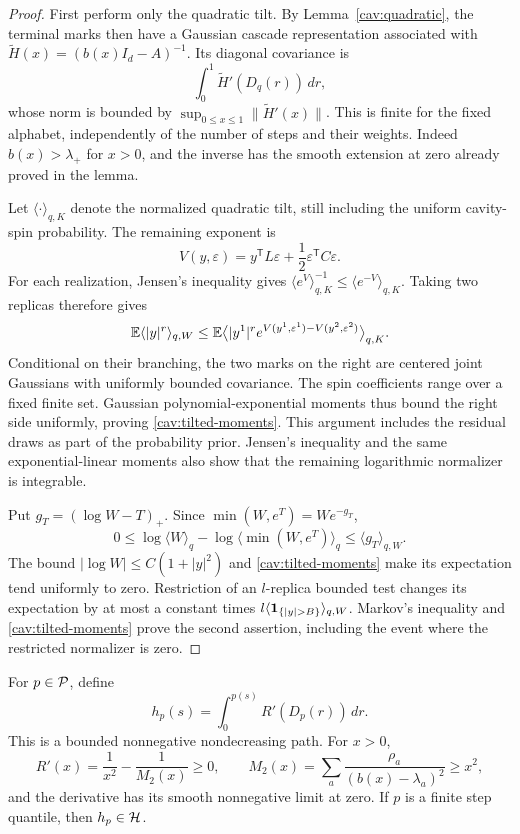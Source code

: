 \begin{proof}
First perform only the quadratic tilt.  By
Lemma~\ref{cav:quadratic}, the terminal marks then have a Gaussian
cascade representation associated with
$\widetilde H(x)=(b(x)I_d-A)^{-1}$.  Its diagonal covariance is
\[
 \int_0^1\widetilde H'(D_q(r))\,dr,
\]
whose norm is bounded by $\sup_{0\le x\le1}\|\widetilde H'(x)\|$.
This is finite for the fixed alphabet, independently of the number of
steps and their weights.  Indeed $b(x)>\lambda_+$ for $x>0$, and the
inverse has the smooth extension at zero already proved in the lemma.

Let $\langle\cdot\rangle_{q,K}$ denote the normalized quadratic
tilt, still including the uniform cavity-spin probability.  The
remaining exponent is
\[
 V(y,\varepsilon)=y^{\mathsf T}L\varepsilon
                  +\frac12\varepsilon^{\mathsf T}C\varepsilon.
\]
For each realization, Jensen's inequality gives
$\langle e^V\rangle_{q,K}^{-1}\le\langle e^{-V}\rangle_{q,K}$.
Taking two replicas therefore gives
\begin{equation}\label{cav:linear-moment-bound}
 \mathbb E\langle|y|^r\rangle_{q,W}
 \le\mathbb E\big\langle |y^1|^r e^{V(y^1,\varepsilon^1)
                                      -V(y^2,\varepsilon^2)}
                \big\rangle_{q,K}.
\end{equation}
Conditional on their branching, the two marks on the right are
centered joint Gaussians with uniformly bounded covariance.  The spin
coefficients range over a fixed finite set.  Gaussian
polynomial-exponential moments thus bound the right side uniformly,
proving \eqref{cav:tilted-moments}.  This argument includes the
residual draws as part of the probability prior.  Jensen's inequality
and the same exponential-linear moments also show that the remaining
logarithmic normalizer is integrable.

Put $g_T=(\log W-T)_+$.  Since
$\min(W,e^T)=We^{-g_T}$,
\[
 0\le\log\langle W\rangle_q
       -\log\langle\min(W,e^T)\rangle_q
 \le\langle g_T\rangle_{q,W}.
\]
The bound $|\log W|\le C(1+|y|^2)$ and
\eqref{cav:tilted-moments} make its expectation tend uniformly to zero.
Restriction of an $l$-replica bounded test changes its expectation by
at most a constant times $l\langle\ind_{\{|y|>B\}}\rangle_{q,W}$.
Markov's inequality and \eqref{cav:tilted-moments} prove the second
assertion, including the event where the restricted normalizer is zero.
\end{proof}

For $p\in\mathcal P$, define
\begin{equation}\label{cav:field-path}
 h_p(s)=\int_0^{p(s)}R'(D_p(r))\,dr.
\end{equation}
This is a bounded nonnegative nondecreasing path.  For $x>0$,
\[
 R'(x)=\frac1{x^2}-\frac1{M_2(x)}\ge0,
 \qquad M_2(x)=\sum_a\frac{\rho_a}{(b(x)-\lambda_a)^2}\ge x^2,
\]
and the derivative has its smooth nonnegative limit at zero.  If $p$
is a finite step quantile, then $h_p\in\mathcal H$.

